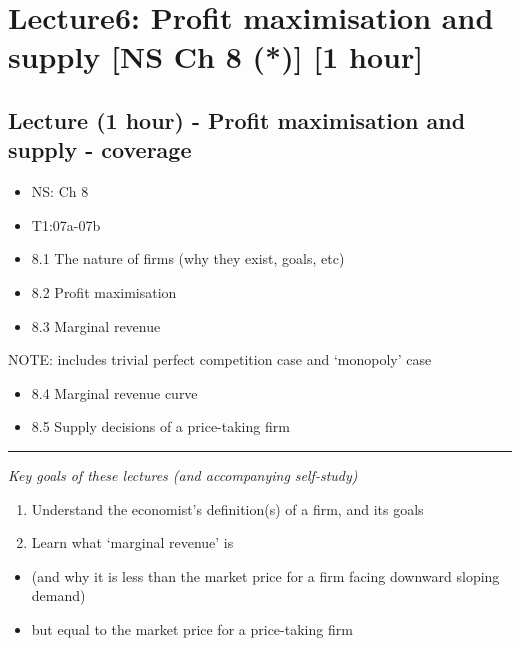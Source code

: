 \documentclass[]{article}
\providecommand{\tightlist}{%
  \setlength{\itemsep}{0pt}\setlength{\parskip}{0pt}}
\begin{document}
\hypertarget{lecture6-profit-maximisation-and-supply-ns-ch-8-1-hour}{%
\section{Lecture6: Profit maximisation and supply {[}NS Ch 8 (*){]} {[}1
hour{]}}\label{lecture6-profit-maximisation-and-supply-ns-ch-8-1-hour}}

\hypertarget{lecture-1-hour---profit-maximisation-and-supply---coverage}{%
\subsection{Lecture (1 hour) - Profit maximisation and supply -
coverage}\label{lecture-1-hour---profit-maximisation-and-supply---coverage}}

\begin{itemize}
\item
  NS: Ch 8
\item
  T1:07a-07b
\item
  8.1 The nature of firms (why they exist, goals, etc)
\item
  8.2 Profit maximisation
\item
  8.3 Marginal revenue
\end{itemize}

NOTE: includes trivial perfect competition case and `monopoly' case

\begin{itemize}
\tightlist
\item
  8.4 Marginal revenue curve
\item
  8.5 Supply decisions of a price-taking firm
\end{itemize}

\begin{center}\rule{0.5\linewidth}{\linethickness}\end{center}

\emph{Key goals of these lectures (and accompanying self-study)}

\begin{enumerate}
\def\labelenumi{\arabic{enumi}.}
\tightlist
\item
  Understand the economist's definition(s) of a firm, and its goals
\item
  Learn what `marginal revenue' is
\end{enumerate}

\begin{itemize}
\tightlist
\item
  (and why it is less than the market price for a firm facing downward
  sloping demand)
\item
  but equal to the market price for a price-taking firm
\end{itemize}
\end{document}
